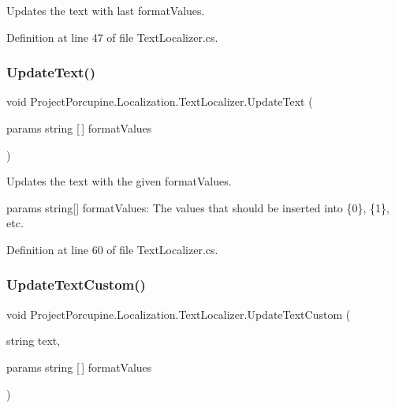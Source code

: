 Updates the text with last format\+Values. 



Definition at line 47 of file Text\+Localizer.\+cs.

\mbox{\label{class_project_porcupine_1_1_localization_1_1_text_localizer_a536420f231dc0c052270c3760ac6ed1e}} 
\subsubsection{\texorpdfstring{Update\+Text()}{UpdateText()}\hspace{0.1cm}{\footnotesize\ttfamily [2/2]}}
{\footnotesize\ttfamily void Project\+Porcupine.\+Localization.\+Text\+Localizer.\+Update\+Text (\begin{DoxyParamCaption}\item[{params string \mbox{[}$\,$\mbox{]}}]{format\+Values }\end{DoxyParamCaption})}



Updates the text with the given format\+Values. 

params string\mbox{[}\mbox{]} format\+Values\+: The values that should be inserted into \{0\}, \{1\}, etc. 

Definition at line 60 of file Text\+Localizer.\+cs.

\mbox{\label{class_project_porcupine_1_1_localization_1_1_text_localizer_af61004030ca8202d0ffba67bdfd6fb32}} 
\subsubsection{\texorpdfstring{Update\+Text\+Custom()}{UpdateTextCustom()}}
{\footnotesize\ttfamily void Project\+Porcupine.\+Localization.\+Text\+Localizer.\+Update\+Text\+Custom (\begin{DoxyParamCaption}\item[{string}]{text,  }\item[{params string \mbox{[}$\,$\mbox{]}}]{format\+Values }\end{DoxyParamCaption})}



